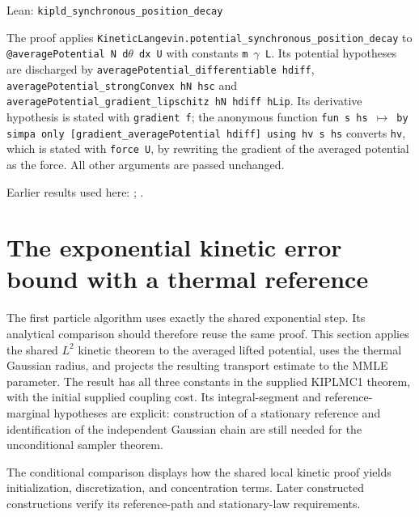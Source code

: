 \documentclass[11pt,a4paper]{report}
\begin{document}
\begin{leanbox}{Lean: \texttt{kipld\_\allowbreak{}synchronous\_\allowbreak{}position\_\allowbreak{}decay}}




The proof applies \texttt{Kinetic\allowbreak{}Langevin.\allowbreak{}potential\_\allowbreak{}synchronous\_\allowbreak{}position\_\allowbreak{}decay} to \texttt{@average\allowbreak{}Potential N d\ensuremath{\theta} dx U} with constants \texttt{m \ensuremath{\gamma} L}. Its potential hypotheses are discharged by \texttt{average\allowbreak{}Potential\_\allowbreak{}differentiable hdiff}, \texttt{average\allowbreak{}Potential\_\allowbreak{}strong\allowbreak{}Convex h\allowbreak{}N hsc} and \texttt{average\allowbreak{}Potential\_\allowbreak{}gradient\_\allowbreak{}lipschitz h\allowbreak{}N hdiff h\allowbreak{}Lip}. Its derivative hypothesis is stated with \texttt{gradient f}; the anonymous function \texttt{fun s hs \ensuremath{\mapsto} by simpa only [gradient\_\allowbreak{}average\allowbreak{}Potential hdiff] using hv s hs} converts \texttt{hv}, which is stated with \texttt{force U}, by rewriting the gradient of the averaged potential as the force. All other arguments are passed unchanged.
\end{leanbox}


Earlier results used here: \cite[Section~3.1.1]{LangevinLean2026IPLA}; \cite[Section~3.6.5]{LangevinLean2026Kinetic}.
\section{\texorpdfstring{The exponential kinetic error bound with a thermal reference}{The exponential kinetic error bound with a thermal reference}}
\label{proof-module-KIPLMC-ReferenceBound-lean}


The first particle algorithm uses exactly the shared exponential step. Its analytical comparison should therefore reuse the same proof. This section applies the shared \(L^{2}\) kinetic theorem to the averaged lifted potential, uses the thermal Gaussian radius, and projects the resulting transport estimate to the MMLE parameter. The result has all three constants in the supplied KIPLMC1 theorem, with the initial supplied coupling cost. Its integral-segment and reference-marginal hypotheses are explicit: construction of a stationary reference and identification of the independent Gaussian chain are still needed for the unconditional sampler theorem.



The conditional comparison displays how the shared local kinetic proof yields initialization, discretization, and concentration terms. Later constructed constructions verify its reference-path and stationary-law requirements.
\end{document}
